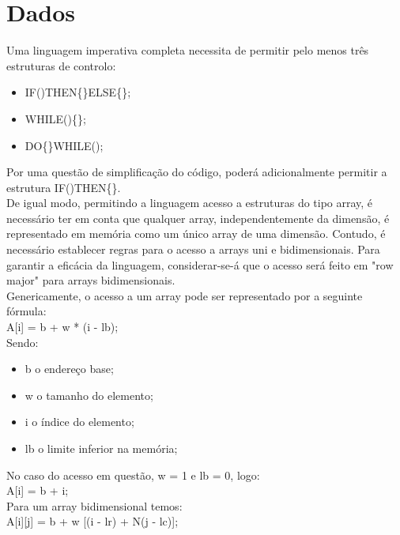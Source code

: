 \section{Dados}
\label{sec:dados:analise}

Uma linguagem imperativa completa necessita de permitir pelo menos três estruturas de controlo:

\begin{itemize}
\item IF()THEN\{\}ELSE\{\};
\item WHILE()\{\};
\item DO\{\}WHILE();
\end{itemize}

Por uma questão de simplificação do código, poderá adicionalmente permitir a estrutura IF()THEN\{\}.\\

De igual modo, permitindo a linguagem acesso a estruturas do tipo array, é necessário ter em conta que qualquer array, independentemente da dimensão, é representado em memória como um único array de uma dimensão. Contudo, é necessário establecer regras para o acesso a arrays uni e bidimensionais. Para garantir a eficácia da linguagem, considerar-se-á que o acesso será feito em "row major" para arrays bidimensionais.\\

Genericamente, o acesso a um array pode ser representado por a seguinte fórmula:\\

A[i] = b + w * (i - lb);\\

Sendo:

\begin{itemize}
\item b o endereço base;
\item w o tamanho do elemento;
\item i o índice do elemento;
\item lb o limite inferior na memória;
\end{itemize}

No caso do acesso em questão, w = 1 e lb = 0, logo:\\

A[i] = b + i;\\


Para um array bidimensional temos:\\

A[i][j] = b + w [(i - lr) + N(j - lc)];\\


